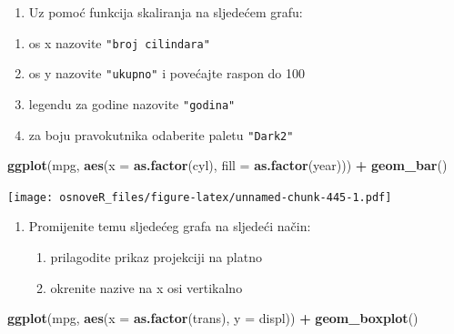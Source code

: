 \documentclass[]{book}
\newenvironment{Shaded}{\begin{snugshade}}{\end{snugshade}}
\newcommand{\KeywordTok}[1]{\textcolor[rgb]{0.13,0.29,0.53}{\textbf{#1}}}
\newcommand{\DataTypeTok}[1]{\textcolor[rgb]{0.13,0.29,0.53}{#1}}
\newcommand{\StringTok}[1]{\textcolor[rgb]{0.31,0.60,0.02}{#1}}
\newcommand{\OperatorTok}[1]{\textcolor[rgb]{0.81,0.36,0.00}{\textbf{#1}}}
\newcommand{\NormalTok}[1]{#1}
\providecommand{\tightlist}{%
  \setlength{\itemsep}{0pt}\setlength{\parskip}{0pt}}
\theoremstyle{definition}
\theoremstyle{definition}
\theoremstyle{definition}
\theoremstyle{remark}
\begin{document}
\begin{enumerate}
\def\labelenumi{\arabic{enumi}.}
\setcounter{enumi}{2}
\tightlist
\item
  Uz pomoć funkcija skaliranja na sljedećem grafu:
\end{enumerate}

\begin{enumerate}
\def\labelenumi{\alph{enumi})}
\tightlist
\item
  os x nazovite \texttt{"broj\ cilindara"}
\item
  os y nazovite \texttt{"ukupno"} i povećajte raspon do 100
\item
  legendu za godine nazovite \texttt{"godina"}
\item
  za boju pravokutnika odaberite paletu \texttt{"Dark2"}
\end{enumerate}

\begin{Shaded}
\begin{Highlighting}[]
\KeywordTok{ggplot}\NormalTok{(mpg, }\KeywordTok{aes}\NormalTok{(}\DataTypeTok{x =} \KeywordTok{as.factor}\NormalTok{(cyl), }
                \DataTypeTok{fill =} \KeywordTok{as.factor}\NormalTok{(year))) }\OperatorTok{+}\StringTok{ }\KeywordTok{geom_bar}\NormalTok{()}
\end{Highlighting}
\end{Shaded}

\texttt{[image: osnoveR\_files/figure-latex/unnamed-chunk-445-1.pdf]}

\begin{enumerate}
\def\labelenumi{\arabic{enumi}.}
\setcounter{enumi}{3}
\tightlist
\item
  Promijenite temu sljedećeg grafa na sljedeći način:

  \begin{enumerate}
  \def\labelenumii{\alph{enumii})}
  \tightlist
  \item
    prilagodite prikaz projekciji na platno
  \item
    okrenite nazive na x osi vertikalno
  \end{enumerate}
\end{enumerate}

\begin{Shaded}
\begin{Highlighting}[]
\KeywordTok{ggplot}\NormalTok{(mpg, }\KeywordTok{aes}\NormalTok{(}\DataTypeTok{x =} \KeywordTok{as.factor}\NormalTok{(trans), }\DataTypeTok{y =}\NormalTok{ displ)) }\OperatorTok{+}\StringTok{ }
\StringTok{  }\KeywordTok{geom_boxplot}\NormalTok{() }
\end{Highlighting}
\end{Shaded}
\end{document}
